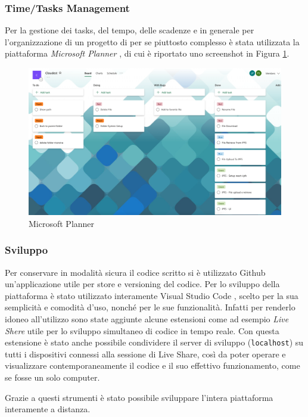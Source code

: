 \documentclass{article}
\begin{document}
\subsubsection{Time/Tasks Management}
Per la gestione dei tasks, del tempo, delle scadenze e in generale per l'organizzazione di un progetto di per se piuttosto complesso è stata utilizzata la piattaforma \textit{Microsoft Planner} \cite{microsoft_planner}, di cui è riportato uno screenshot in Figura \ref{fig:planner}.
\begin{figure}[!ht]
  \includegraphics[width=16cm]{images/planner.png}
  \centering
  \caption{Microsoft Planner}
  \label{fig:planner}
\end{figure}

\subsubsection{Sviluppo}
Per conservare in modalità sicura il codice scritto si è utilizzato Github un'applicazione utile per store e versioning del codice.
Per lo sviluppo della piattaforma è stato utilizzato interamente Visual Studio Code \cite{vs_code}, scelto per la sua semplicità e comodità d'uso, nonché per le sue funzionalità. Infatti per renderlo idoneo all'utilizzo sono state aggiunte alcune estensioni come ad esempio \textit{Live Shere} utile per lo sviluppo simultaneo di codice in tempo reale. Con questa estensione è stato anche possibile condividere il server di sviluppo (\texttt{localhost}) su tutti i dispositivi connessi alla sessione di Live Share, così da poter operare e visualizzare contemporaneamente il codice e il suo effettivo funzionamento, come se fosse un solo computer.

Grazie a questi strumenti è stato possibile sviluppare l'intera piattaforma interamente a distanza.
\end{document}

